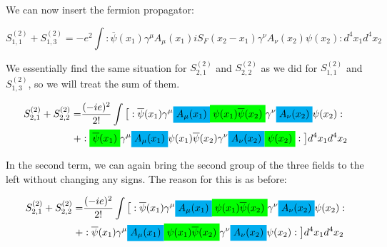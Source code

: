 \documentclass[a4]{article}
\newcommand{\highlight}[2][yellow]{\mathchoice
  {\colorbox{#1}{$\displaystyle#2$}}
  {\colorbox{#1}{$\textstyle#2$}}
  {\colorbox{#1}{$\scriptstyle#2$}}
  {\colorbox{#1}{$\scriptscriptstyle#2$}}}
\begin{document}
        We can now insert the fermion propagator:

        \begin{framed}
            \begin{equation}
                S^{(2)}_{1,1} + S^{(2)}_{1,3} = - e^{2} \int :\overline{\psi} (x_1) \gamma^{\mu} A_{\mu} (x_1) i S_{F} (x_2 - x_1) \gamma^{\nu} A_{\nu} (x_2) \psi (x_2): d^{4} x_{1} d^{4} x_{2}
            \end{equation}
        \end{framed}

        We essentially find the same situation for $S^{(2)}_{2,1}$ and $S^{(2)}_{2,2}$ as we did for $S^{(2)}_{1,1}$ and $S^{(2)}_{1,3}$, so we will treat the sum of them.

        \begin{equation}
            \begin{aligned}
            S^{(2)}_{2,1} + S^{(2)}_{2,2} = & \frac{(-ie)^2}{2!} \int \big[ :\overline{\psi} (x_1) \gamma^{\mu} \highlight[cyan]{A_{\mu} (x_1)} \highlight[green]{\psi (x_1) \overline{\psi} (x_2)} \gamma^{\nu} \highlight[cyan]{A_{\nu} (x_2)} \psi (x_2): \\
            + & :\highlight[green]{\overline{\psi} (x_1)} \gamma^{\mu} \highlight[cyan]{A_{\mu} (x_1)} \psi (x_1) \overline{\psi} (x_2) \gamma^{\nu} \highlight[cyan]{A_{\nu} (x_2)} \highlight[green]{\psi (x_2)}: \big] d^{4} x_{1} d^{4} x_{2}
            \end{aligned}
        \end{equation}

        In the second term, we can again bring the second group of the three fields to the left without changing any signs. The reason for this is as before:

        \begin{equation}
            \begin{aligned}
            S^{(2)}_{2,1} + S^{(2)}_{2,2} = & \frac{(-ie)^2}{2!} \int \big[ :\overline{\psi} (x_1) \gamma^{\mu} \highlight[cyan]{A_{\mu} (x_1)} \highlight[green]{\psi (x_1) \overline{\psi} (x_2)} \gamma^{\nu} \highlight[cyan]{A_{\nu} (x_2)} \psi (x_2): \\
            + & :\overline{\psi} (x_1) \gamma^{\mu} \highlight[cyan]{A_{\mu} (x_1)} \highlight[green]{\psi (x_1) \overline{\psi} (x_2)} \gamma^{\nu} \highlight[cyan]{A_{\nu} (x_2)} \psi (x_2): \big] d^{4} x_{1} d^{4} x_{2}
            \end{aligned}
        \end{equation}
\end{document}
